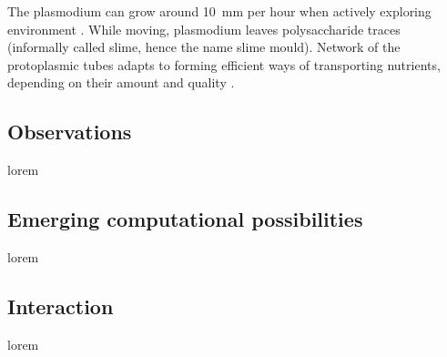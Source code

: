 The plasmodium can grow around 10~mm per hour when actively exploring environment \cite{coggin1996dynamic}. While moving, plasmodium leaves polysaccharide traces (informally called slime, hence the name slime mould). Network of the protoplasmic tubes adapts to forming efficient ways of transporting nutrients, depending on their amount and quality \cite{nakagaki2004obtaining}. 


\subsection{Observations}

lorem


\subsection{Emerging computational possibilities}

lorem


\subsection{Interaction}

lorem


